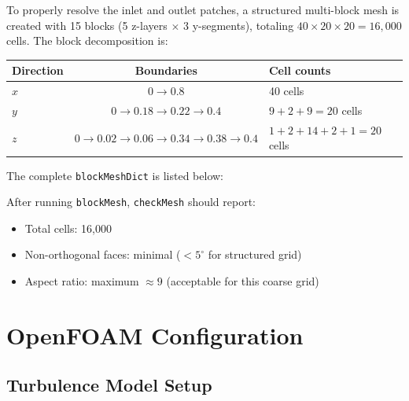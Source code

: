 \documentclass[12pt]{article}
\begin{document}
To properly resolve the inlet and outlet patches, a structured multi-block mesh is created with 15 blocks (5 z-layers $\times$ 3 y-segments), totaling $40 \times 20 \times 20 = 16{,}000$ cells. The block decomposition is:

\begin{center}
\begin{tabular}{lcl}
\toprule
Direction & Boundaries & Cell counts \\
\midrule
$x$ & $0 \to 0.8$ & 40 cells \\
$y$ & $0 \to 0.18 \to 0.22 \to 0.4$ & $9 + 2 + 9 = 20$ cells \\
$z$ & $0 \to 0.02 \to 0.06 \to 0.34 \to 0.38 \to 0.4$ & $1 + 2 + 14 + 2 + 1 = 20$ cells \\
\bottomrule
\end{tabular}
\end{center}

The complete \texttt{blockMeshDict} is listed below:



\noindent After running \texttt{blockMesh}, \texttt{checkMesh} should report:
\begin{itemize}
    \item Total cells: 16,000
    \item Non-orthogonal faces: minimal ($<5^\circ$ for structured grid)
    \item Aspect ratio: maximum $\approx 9$ (acceptable for this coarse grid)
\end{itemize}

\section{OpenFOAM Configuration}

\subsection{Turbulence Model Setup}



\end{document}
